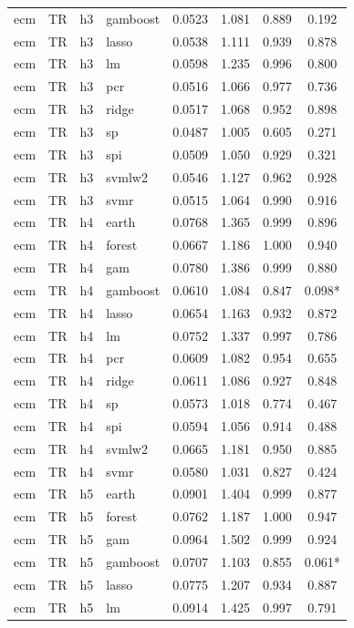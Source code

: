 \begin{ThreePartTable}
\begin{longtable}[t]{llclcccc}
ecm & TR & h3 & gamboost & 0.0523 & 1.081 & 0.889 & 0.192\\
ecm & TR & h3 & lasso & 0.0538 & 1.111 & 0.939 & 0.878\\
ecm & TR & h3 & lm & 0.0598 & 1.235 & 0.996 & 0.800\\
ecm & TR & h3 & pcr & 0.0516 & 1.066 & 0.977 & 0.736\\
ecm & TR & h3 & ridge & 0.0517 & 1.068 & 0.952 & 0.898\\
ecm & TR & h3 & sp & 0.0487 & 1.005 & 0.605 & 0.271\\
ecm & TR & h3 & spi & 0.0509 & 1.050 & 0.929 & 0.321\\
ecm & TR & h3 & svmlw2 & 0.0546 & 1.127 & 0.962 & 0.928\\
ecm & TR & h3 & svmr & 0.0515 & 1.064 & 0.990 & 0.916\\
\addlinespace
ecm & TR & h4 & earth & 0.0768 & 1.365 & 0.999 & 0.896\\
ecm & TR & h4 & forest & 0.0667 & 1.186 & 1.000 & 0.940\\
ecm & TR & h4 & gam & 0.0780 & 1.386 & 0.999 & 0.880\\
ecm & TR & h4 & gamboost & 0.0610 & 1.084 & 0.847 & 0.098*\\
ecm & TR & h4 & lasso & 0.0654 & 1.163 & 0.932 & 0.872\\
ecm & TR & h4 & lm & 0.0752 & 1.337 & 0.997 & 0.786\\
ecm & TR & h4 & pcr & 0.0609 & 1.082 & 0.954 & 0.655\\
ecm & TR & h4 & ridge & 0.0611 & 1.086 & 0.927 & 0.848\\
ecm & TR & h4 & sp & 0.0573 & 1.018 & 0.774 & 0.467\\
ecm & TR & h4 & spi & 0.0594 & 1.056 & 0.914 & 0.488\\
ecm & TR & h4 & svmlw2 & 0.0665 & 1.181 & 0.950 & 0.885\\
ecm & TR & h4 & svmr & 0.0580 & 1.031 & 0.827 & 0.424\\
\addlinespace
ecm & TR & h5 & earth & 0.0901 & 1.404 & 0.999 & 0.877\\
ecm & TR & h5 & forest & 0.0762 & 1.187 & 1.000 & 0.947\\
ecm & TR & h5 & gam & 0.0964 & 1.502 & 0.999 & 0.924\\
ecm & TR & h5 & gamboost & 0.0707 & 1.103 & 0.855 & 0.061*\\
ecm & TR & h5 & lasso & 0.0775 & 1.207 & 0.934 & 0.887\\
ecm & TR & h5 & lm & 0.0914 & 1.425 & 0.997 & 0.791\\

\end{longtable}
\end{ThreePartTable}
